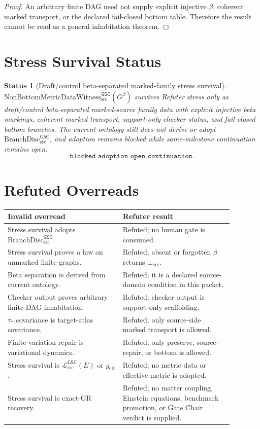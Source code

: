 \documentclass[11pt]{article}
\newcommand{\Witness}{\mathrm{NonBottomMetricDataWitness}_{\mathrm{src}}^{\mathsf{GSC}}}
\newcommand{\MetricData}{\mathcal{L}_{\mathrm{src}}^{\mathsf{GSC}}}
\newcommand{\BottomSrc}{\bot_{\mathrm{src}}}
\newcommand{\geff}{g_{\mathrm{eff}}}
\newcommand{\BranchDisc}{\mathrm{BranchDisc}_{\mathrm{src}}^{\mathsf{GSC}}}
\newtheorem{status}{Status}
\begin{document}
\begin{proof}
An arbitrary finite DAG need not supply explicit injective \(\beta\), coherent
marked transport, or the declared fail-closed bottom table. Therefore the
result cannot be read as a general inhabitation theorem.
\end{proof}

\section{Stress Survival Status}

\begin{status}[Draft/control beta-separated marked-family stress survival]
\(\Witness(G^\beta)\) survives Refuter stress only as draft/control
beta-separated marked-source family data with explicit injective beta
markings, coherent marked transport, support-only checker status, and
fail-closed bottom branches. The current ontology still does not derive or
adopt \(\BranchDisc\), and adoption remains blocked while same-milestone
continuation remains open:
\[
  \texttt{blocked\_adoption\_open\_continuation}.
\]
\end{status}

\section{Refuted Overreads}

\begin{center}
\begin{tabular}{p{0.45\linewidth}p{0.43\linewidth}}
\toprule
Invalid overread & Refuter result \\
\midrule
Stress survival adopts \(\BranchDisc\). &
Refuted; no human gate is consumed. \\
Stress survival proves a law on unmarked finite graphs. &
Refuted; absent or forgotten \(\beta\) returns \(\BottomSrc\). \\
Beta separation is derived from current ontology. &
Refuted; it is a declared source-domain condition in this packet. \\
Checker output proves arbitrary finite-DAG inhabitation. &
Refuted; checker output is support-only scaffolding. \\
\(\tau_\ast\) covariance is target-atlas covariance. &
Refuted; only source-side marked transport is allowed. \\
Finite-variation repair is variational dynamics. &
Refuted; only preserve, source-repair, or bottom is allowed. \\
Stress survival is \(\MetricData(E)\) or \(\geff\). &
Refuted; no metric data or effective metric is adopted. \\
Stress survival is exact-GR recovery. &
Refuted; no matter coupling, Einstein equations, benchmark promotion, or Gate
Chair verdict is supplied. \\
\bottomrule
\end{tabular}
\end{center}
\end{document}

